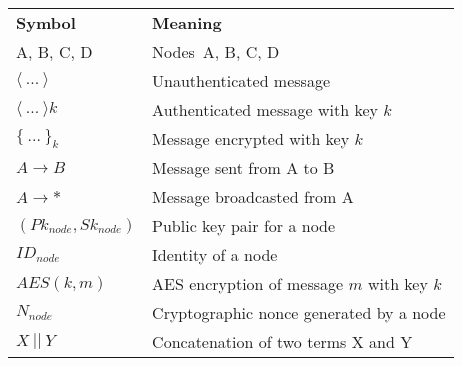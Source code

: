 \begin{tcolorbox}[title=Notation used in protocol specifications]
\begin{tabular}{ll}
\multicolumn{1}{p{1.3cm}}{\textbf{Symbol}} & \multicolumn{1}{p{4cm}}{\textbf{Meaning}}\\
A, B, C, D & Nodes\ A, B, C, D\\
$\langle{\ ...\ }\rangle{}$ & Unauthenticated message\\
$\langle{\ ...\ }\rangle{k}$ & Authenticated message with key $k$\\
$\{\ ...\ \}_k$ & Message encrypted with key $k$\\
$A \rightarrow B$ & Message sent from A to B\\
$A \rightarrow *$ & Message broadcasted from A\\
$(Pk_{node}, Sk_{node})$ & Public key pair for a node \\
$ID_{node}$ & Identity of a node\\
$AES(k, m)$ & AES encryption of message $m$ with key $k$\\
$N_{node}$ & Cryptographic nonce generated by a node\\
$X\ ||\ Y$ & Concatenation of two terms X and Y\\ 
\end{tabular}
\end{tcolorbox}


